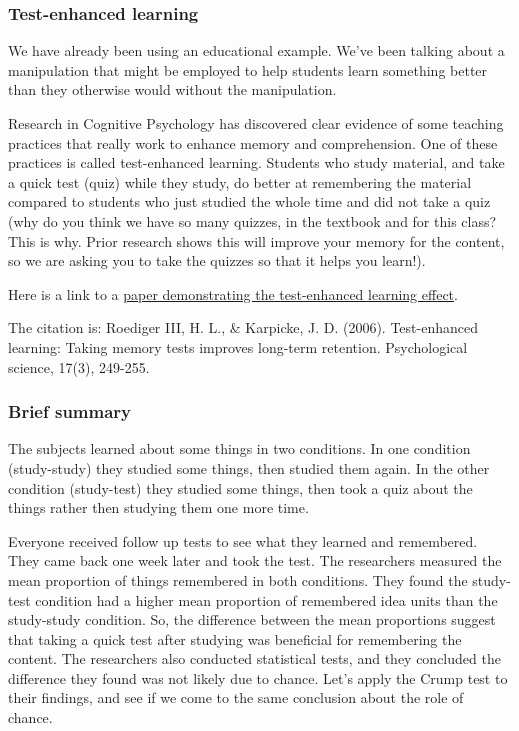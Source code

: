 \documentclass[]{book}
\begin{document}
\subsubsection{Test-enhanced learning}\label{test-enhanced-learning}

We have already been using an educational example. We've been talking
about a manipulation that might be employed to help students learn
something better than they otherwise would without the manipulation.

Research in Cognitive Psychology has discovered clear evidence of some
teaching practices that really work to enhance memory and comprehension.
One of these practices is called test-enhanced learning. Students who
study material, and take a quick test (quiz) while they study, do better
at remembering the material compared to students who just studied the
whole time and did not take a quiz (why do you think we have so many
quizzes, in the textbook and for this class? This is why. Prior research
shows this will improve your memory for the content, so we are asking
you to take the quizzes so that it helps you learn!).

Here is a link to a
\href{https://www.jstor.org/stable/pdf/40064526.pdf?casa_token=jMQnevvTRoIAAAAA:J96DQ0EHWCDKvjV3D-OdQ7TFnJ_DTZEz_G6zG1YMstqGu7fuzjzM0V4PiNREvB1sfLxTXn68FpHhoIUFpOx9p5fjsB7hcqQTUCQix9jxdj_hx-zqoZ8}{paper
demonstrating the test-enhanced learning effect}.

The citation is: Roediger III, H. L., \& Karpicke, J. D. (2006).
Test-enhanced learning: Taking memory tests improves long-term
retention. Psychological science, 17(3), 249-255.

\subsubsection{Brief summary}\label{brief-summary}

The subjects learned about some things in two conditions. In one
condition (study-study) they studied some things, then studied them
again. In the other condition (study-test) they studied some things,
then took a quiz about the things rather then studying them one more
time.

Everyone received follow up tests to see what they learned and
remembered. They came back one week later and took the test. The
researchers measured the mean proportion of things remembered in both
conditions. They found the study-test condition had a higher mean
proportion of remembered idea units than the study-study condition. So,
the difference between the mean proportions suggest that taking a quick
test after studying was beneficial for remembering the content. The
researchers also conducted statistical tests, and they concluded the
difference they found was not likely due to chance. Let's apply the
Crump test to their findings, and see if we come to the same conclusion
about the role of chance.
\end{document}
